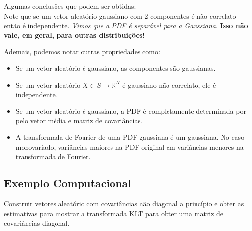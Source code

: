 \documentclass{article}
\begin{document}
Algumas conclusões que podem ser obtidas:
\\
Note que se um vetor aleatório gaussiano com 2 componentes é não-correlato
então é independente. \textit{Vimos que a PDF é separável para a Gaussiana}.
\textbf{Isso não vale, em geral, para outras distribuições!}

Ademais, podemos notar outras propriedades como:
\begin{itemize}
    \item Se um vetor aleatório é gaussiano, as componentes são gaussianas.
    \item Se um vetor aleatório $X \in S \to \mathbb{R}^N$ é gaussiano
        não-correlato, ele é independente.
    \item Se um vetor aleatório é gaussiano, a PDF é completamente determinada
        por pelo vetor média e matriz de covariâncias.
    \item A transformada de Fourier de uma PDF gaussiana é um gaussiana. No
        caso monovariado, variâncias maiores na PDF original em variâncias
        menores na transformada de Fourier.
\end{itemize}

\subsection{Exemplo Computacional}
Construir vetores aleatório com covariâncias não diagonal a princípio e obter
as estimativas para mostrar a transformada KLT para obter uma matriz de
covariâncias diagonal.
\end{document}
